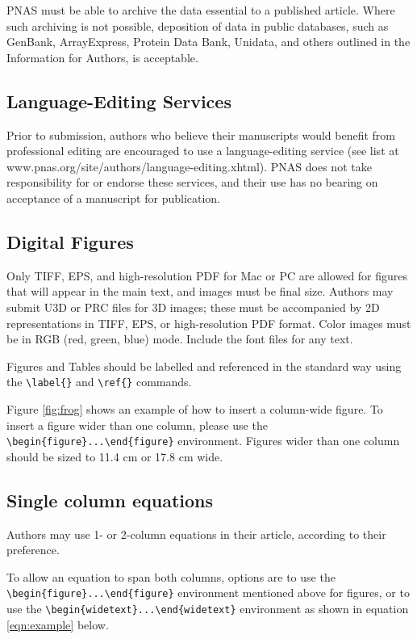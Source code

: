 \documentclass[9pt,twocolumn,twoside]{pnas-new}
\begin{document}
PNAS must be able to archive the data essential to a published article. Where such archiving is not possible, deposition of data in public databases, such as GenBank, ArrayExpress, Protein Data Bank, Unidata, and others outlined in the Information for Authors, is acceptable.

\subsection*{Language-Editing Services}
Prior to submission, authors who believe their manuscripts would benefit from professional editing are encouraged to use a language-editing service (see list at www.pnas.org/site/authors/language-editing.xhtml). PNAS does not take responsibility for or endorse these services, and their use has no bearing on acceptance of a manuscript for publication. 

\subsection*{Digital Figures}
\label{sec:figures}

Only TIFF, EPS, and high-resolution PDF for Mac or PC are allowed for figures that will appear in the main text, and images must be final size. Authors may submit U3D or PRC files for 3D images; these must be accompanied by 2D representations in TIFF, EPS, or high-resolution PDF format.  Color images must be in RGB (red, green, blue) mode. Include the font files for any text. 

Figures and Tables should be labelled and referenced in the standard way using the \verb|\label{}| and \verb|\ref{}| commands.

Figure \ref{fig:frog} shows an example of how to insert a column-wide figure. To insert a figure wider than one column, please use the \verb|\begin{figure}...\end{figure}| environment. Figures wider than one column should be sized to 11.4 cm or 17.8 cm wide.

\subsection*{Single column equations}

Authors may use 1- or 2-column equations in their article, according to their preference.

To allow an equation to span both columns, options are to use the \verb|\begin{figure}...\end{figure}| environment mentioned above for figures, or to use the \verb|\begin{widetext}...\end{widetext}| environment as shown in equation \ref{eqn:example} below.
\end{document}
